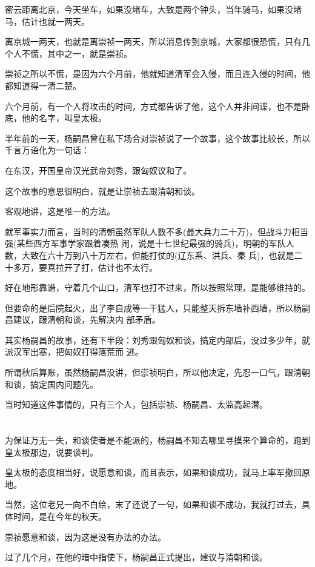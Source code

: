 \documentclass[11pt,a4paper,onecolumn]{article}
\begin{document}
密云距离北京，今天坐车，如果没堵车，大致是两个钟头，当年骑马，如果没堵马，估计也就一两天。

离京城一两天，也就是离崇祯一两天，所以消息传到京城，大家都很恐慌，只有几个人不慌，其中之一，就是崇祯。

崇祯之所以不慌，是因为六个月前，他就知道清军会入侵，而且连入侵的时间，他都知道得一清二楚。

六个月前，有一个人将攻击的时间，方式都告诉了他，这个人并非间谍，也不是卧底，他的名字，叫皇太极。

半年前的一天，杨嗣昌曾在私下场合对崇祯说了一个故事，这个故事比较长，所以千言万语化为一句话：

在东汉，开国皇帝汉光武帝刘秀，跟匈奴议和了。

这个故事的意思很明白，就是让崇祯去跟清朝和谈。

客观地讲，这是唯一的方法。

就军事实力而言，当时的清朝虽然军队人数不多(最大兵力二十万)，但战斗力相当强(某些西方军事学家跟着凑热
闹，说是十七世纪最强的骑兵)，明朝的军队人数，大致在六十万到八十万左右，但能打仗的(辽东系、洪兵、秦
兵)，也就是二十多万，要真拉开了打，估计也不太行。

好在地形靠谱，守着几个山口，清军也打不过来，所以按照常理，是能够维持的。

但要命的是后院起火，出了李自成等一干猛人，只能整天拆东墙补西墙，所以杨嗣昌建议，跟清朝和谈，先解决内
部矛盾。

其实杨嗣昌的故事，还有下半段：刘秀跟匈奴和谈，搞定内部后，没过多少年，就派汉军出塞，把匈奴打得落荒而
逃。

所谓秋后算账，虽然杨嗣昌没讲，但崇祯明白，所以他决定，先忍一口气，跟清朝和谈，搞定国内问题先。

当时知道这件事情的，只有三个人，包括崇祯、杨嗣昌、太监高起潜。

\section[\thesection]{}

为保证万无一失，和谈使者是不能派的，杨嗣昌不知去哪里寻摸来个算命的，跑到皇太极那边，说要谈判。

皇太极的态度相当好，说愿意和谈，而且表示，如果和谈成功，就马上率军撤回原地。

当然，这位老兄一向不白给，末了还说了一句，如果和谈不成功，我就打过去，具体时间，是在今年的秋天。

崇祯愿意和谈，因为这是没有办法的办法。

过了几个月，在他的暗中指使下，杨嗣昌正式提出，建议与清朝和谈。
\end{document}
